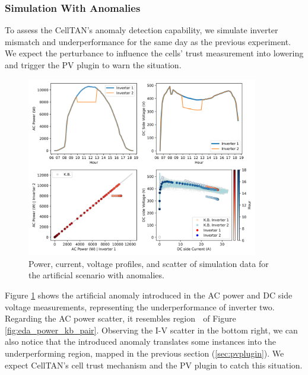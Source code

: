 \subsubsection{Simulation With Anomalies}

To assess the CellTAN's anomaly detection capability, we simulate inverter mismatch and underperformance for the same day as the previous experiment. We expect the perturbance to influence the cells' trust measurement into lowering and trigger the PV plugin to warn the situation.

\begin{figure}[h!]
    \centering
    \includegraphics[width=0.9\textwidth]{figures/chapter5/results/artificial/41_test_clone_02-1.png}
    \caption{Power, current, voltage profiles, and scatter of simulation data for the artificial scenario with anomalies.}
    \label{fig:artificial_02_piv}
\end{figure}

Figure \ref{fig:artificial_02_piv} shows the artificial anomaly introduced in the AC power and DC side voltage measurements, representing the underperformance of inverter two. Regarding the AC power scatter, it resembles region \textcircled{} of Figure \ref{fig:eda_power_kb_pair}. Observing the I-V scatter in the bottom right, we can also notice that the introduced anomaly translates some instances into the underperforming region, mapped in the previous section (\ref{sec:pvplugin}).
We expect CellTAN's cell trust mechanism and the PV plugin to catch this situation.

